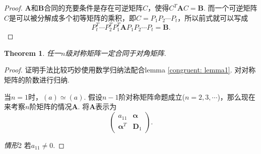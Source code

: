 \documentclass{article}
\newtheorem{theorem}{Theorem}[section]
\newcommand{\mbf}[1]{\bm{#1}}
\begin{document}
\begin{proof}
$\mbf{A}$和$\mbf{B}$合同的充要条件是存在可逆矩阵$C$，使得$C^T\mbf{A}C=\mbf{B}$. 而一个可逆矩阵$C$是可以被分解成多个初等矩阵的乘积，即$C=P_1P_2\cdots P_t$，所以前式就可以写成
$$
P_t^T\cdots P_2^TP_1^T\mbf{A}P_1P_2\cdots P_t = \mbf{B}.
$$
\end{proof}

\begin{theorem}
\rm 任一$n$级对称矩阵一定合同于对角矩阵. 
\end{theorem}

\begin{proof}
\rm 证明手法比较巧妙使用数学归纳法配合lemma \ref{congruent: lemma1}. 对对称矩阵的阶数进行归纳.

当$n=1$时，$(a) \simeq (a)$.
假设$n-1$阶对称矩阵命题成立($n=2,3,\cdots$)，那么现在来考察$n$阶矩阵的情况$\mbf{A}$. 将$\mbf{A}$表示为
$$
\begin{pmatrix}
a_{11} & \mbf{\alpha}\\
\mbf{\alpha}^T & \mbf{D}_1
\end{pmatrix}.
$$

\emph{情形}2 若$a_11 \neq 0$.


\end{proof}
\end{document}
